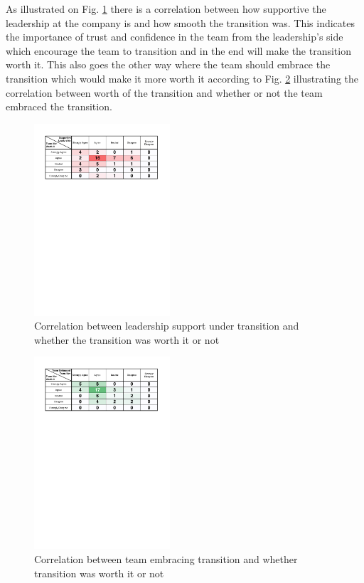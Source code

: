 \documentclass[conference]{IEEEtran}
\begin{document}
As illustrated on Fig. \ref{fig:SupportTransHeat} there is a correlation between how supportive the leadership at the company is and how smooth the transition was. This indicates the importance of trust and confidence in the team from the leadership's side which encourage the team to transition and in the end will make the transition worth it. This also goes the other way where the team should embrace the transition which would make it more worth it according to Fig. \ref{fig:EmbraceTransHeat} illustrating the correlation between worth of the transition and whether or not the team embraced the transition.

\begin{figure}[H]
    \centering
    \includegraphics[trim={1.5cm 21cm 1.5cm 0},clip,width=0.45\textwidth]{images/Emp-SupportTransHeat}
    \caption{Correlation between leadership support under transition and whether the transition was worth it or not}
    \label{fig:SupportTransHeat}
\end{figure}


\begin{figure}[H]
    \centering
    \includegraphics[trim={1.5cm 21cm 1.5cm 0},clip,width=0.45\textwidth]{images/Emp-EmbraceTransHeat}
    \caption{Correlation between team embracing transition and whether transition was worth it or not}
    \label{fig:EmbraceTransHeat} 
\end{figure}
\end{document}
